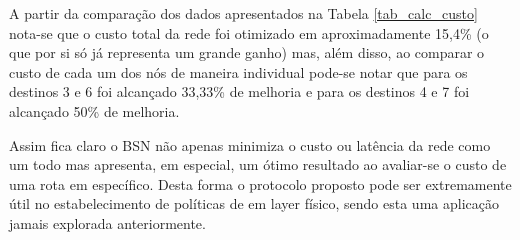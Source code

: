 A partir da comparação dos dados apresentados na Tabela \ref{tab_calc_custo} nota-se que o custo total da rede foi otimizado em aproximadamente 15,4\% (o que por si só já representa um grande ganho) mas, além disso, ao comparar o custo de cada um dos nós de maneira individual pode-se notar que para os destinos 3 e 6 foi alcançado 33,33\% de melhoria e para os destinos 4 e 7 foi alcançado 50\% de melhoria.

Assim fica claro o BSN não apenas minimiza o custo ou latência da rede como um todo mas apresenta, em especial, um ótimo resultado ao avaliar-se o custo de uma rota em específico. Desta forma o protocolo proposto pode ser extremamente útil no estabelecimento de políticas de  em layer físico, sendo esta uma aplicação jamais explorada anteriormente.

